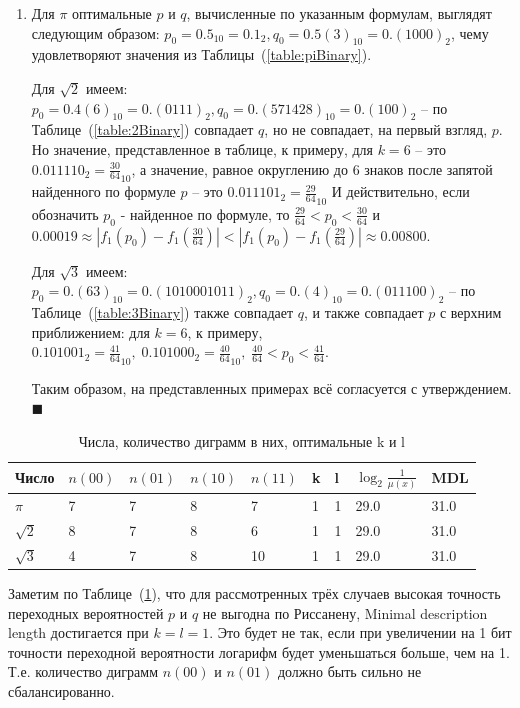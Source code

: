 \documentclass[12pt]{article}
\newcommand{\qed}{\hfill $\blacksquare$}
\begin{document}
\begin{enumerate}
	
	
	\item Для $\pi$ оптимальные $p$ и $q$, вычисленные по указанным формулам, выглядят следующим образом: $p_0=0.5_{10} = 0.1_2, q_0=0.5(3)_{10}=0.(1000)_2$, чему удовлетворяют значения из Таблицы~(\ref{table:piBinary}). 
	
	Для $\sqrt{2}$ имеем: $p_0=0.4(6)_{10}=0.(0111)_2, q_0=0.(571428)_{10}=0.(100)_2$ -- по Таблице~(\ref{table:2Binary}) совпадает $q$, но не совпадает, на первый взгляд, $p$. Но значение, представленное в таблице, к примеру, для $k=6$ -- это $0.011110_2 = \frac{30}{64}_{10}$, а значение, равное округлению до 6 знаков после запятой найденного по формуле $p$ -- это $0.011101_2 = \frac{29}{64}_{10}$ И действительно, если обозначить $p_0$ - найденное по формуле, то $\frac{29}{64} < p_0 < \frac{30}{64}$ и $0.00019\approx\left|f_1(p_0)-f_1\left(\frac{30}{64}\right)\right| < \left|f_1(p_0)-f_1\left(\frac{29}{64}\right)\right|\approx0.00800$.
	
	Для $\sqrt{3}$ имеем: $p_0=0.(63)_{10}=0.(1010001011)_2, q_0=0.(4)_{10}=0.(011100)_2$ -- по Таблице~(\ref{table:3Binary}) также совпадает $q$, и также совпадает $p$ с верхним приближением: для $k=6$, к примеру, $0.101001_2 = \frac{41}{64}_{10},\;0.101000_2 = \frac{40}{64}_{10},\;\frac{40}{64}<p_0<\frac{41}{64}$. 
	
	Таким образом, на представленных примерах всё согласуется с утверждением.\qed
	\end{enumerate}
	
	\begin{table}[!h]
		\caption{Числа, количество диграмм в них, оптимальные k и l}
		\label{table:digramsPi23}
		\begin{center}
			\begin{tabular}{|l|l|l|l|l|l|l|l|l|}
			\hline
			Число & $n(00)$ & $n(01)$ & $n(10)$ & $n(11)$ & k & l & $\log_2{\frac{1}{\mu(x)}}$& MDL\\
			\hline
			$\pi$ & 7 & 7 & 8 & 7 & 1 & 1 & 29.0 & 31.0\\
			\hline
			$\sqrt{2}$ & 8 & 7 & 8 & 6 & 1 & 1 & 29.0 & 31.0\\
			\hline
			$\sqrt{3}$ & 4 & 7 & 8 & 10 & 1 & 1 & 29.0 & 31.0\\
			\hline
		\end{tabular}
	\end{center}
	\end{table}

	Заметим по Таблице~(\ref{table:digramsPi23}), что для рассмотренных трёх случаев высокая точность переходных вероятностей $p$ и $q$ не выгодна по Риссанену, Minimal description length достигается при $k=l=1$. Это будет не так, если при увеличении на 1 бит точности переходной вероятности логарифм будет уменьшаться больше, чем на 1. Т.е. количество диграмм $n(00)$ и $n(01)$ должно быть сильно не сбалансированно. %
	
\end{document}
